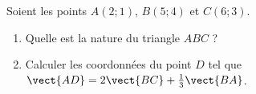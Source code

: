 
\begin{exercice}\label{exosmath-0667}

    Soient les points \( A(2;1)\), \( B(5;4)\) et \( C(6;3)\).
    \begin{enumerate}
        \item
            Quelle est la nature du triangle \( ABC\) ?
        \item
            Calculer les coordonnées du point \( D\) tel que \( \vect{ AD }=2\vect{ BC }+\frac{1}{ 3 }\vect{ BA }\).
    \end{enumerate}

\end{exercice}
